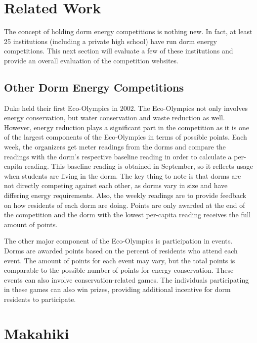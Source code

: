 \chapter{Related Work}
\label{relatedwork}

The concept of holding dorm energy competitions is nothing new.  In fact, at least 25 institutions (including a private high school) have run dorm energy competitions.  This next section will evaluate a few of these institutions and provide an overall evaluation of the competition websites.

\section{Other Dorm Energy Competitions}
\label{othercomps}

Duke held their first Eco-Olympics\cite{duke-eco-lympics} in 2002.  The Eco-Olympics not only involves energy conservation, but water conservation and waste reduction as well.  However, energy reduction plays a significant part in the competition as it is one of the largest components of the Eco-Olympics in terms of possible points.  Each week, the organizers get meter readings from the dorms and compare the readings with the dorm's respective baseline reading in order to calculate a per-capita reading.  This baseline reading is obtained in September, so it reflects usage when students are living in the dorm.   The key thing to note is that dorms are not directly competing against each other, as dorms vary in size and have differing energy requirements.  Also, the weekly readings are to provide feedback on how residents of each dorm are doing.  Points are only awarded at the end of the competition and the dorm with the lowest per-capita reading receives the full amount of points.

The other major component of the Eco-Olympics is participation in events.  Dorms are awarded points based on the percent of residents who attend each event.  The amount of points for each event may vary, but the total points is comparable to the possible number of points for energy conservation.  These events can also involve conservation-related games.  The individuals participating in these games can also win prizes, providing additional incentive for dorm residents to participate.

\chapter{Makahiki}
\label{makahiki}

